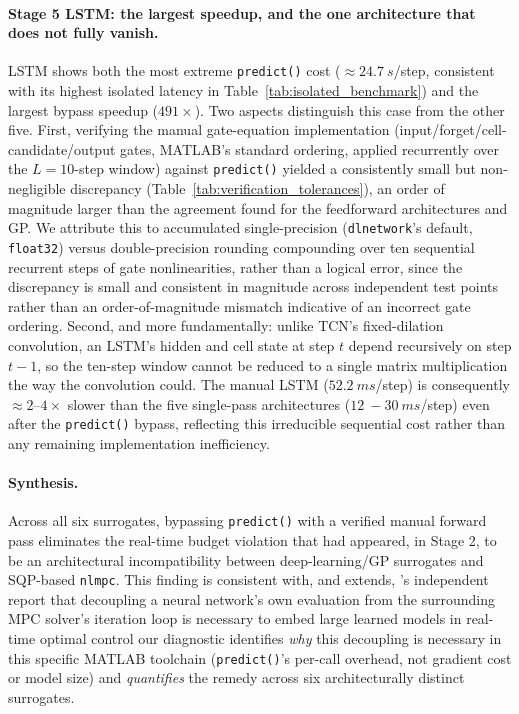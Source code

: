 \paragraph{Stage 5  LSTM: the largest speedup, and the one
architecture that does not fully vanish.} LSTM shows both the most
extreme \texttt{predict()} cost ($\approx\SI{24.7}{s}$/step, consistent
with its highest isolated latency in Table~\ref{tab:isolated_benchmark})
and the largest bypass speedup ($491\times$). Two aspects distinguish
this case from the other five. First, verifying the manual
gate-equation implementation (input/forget/cell-candidate/output gates,
MATLAB's standard ordering, applied recurrently over the
$L=10$-step window) against \texttt{predict()} yielded a consistently
small but non-negligible discrepancy (Table~\ref{tab:verification_tolerances}),
an order of magnitude larger than the agreement found for the feedforward architectures
and GP. We attribute this to accumulated single-precision
(\texttt{dlnetwork}'s default, \texttt{float32}) versus
double-precision rounding compounding over ten sequential recurrent
steps of gate nonlinearities, rather than a logical error, since the
discrepancy is small and consistent in magnitude across independent
test points rather than an order-of-magnitude mismatch indicative of an
incorrect gate ordering.
\label{subsec:lstm_precision_note}
Second, and more fundamentally: unlike TCN's fixed-dilation
convolution, an LSTM's hidden and cell state at step $t$ depend
recursively on step $t-1$, so the ten-step window cannot be reduced to
a single matrix multiplication the way the convolution could. The
manual LSTM ($\SI{52.2}{ms}$/step) is consequently $\approx 2$--$4\times$
slower than the five single-pass architectures ($\SI{12}{-}\SI{30}{ms}$/step)
even after the \texttt{predict()} bypass, reflecting this irreducible
sequential cost rather than any remaining implementation inefficiency.

\paragraph{Synthesis.} Across all six surrogates, bypassing
\texttt{predict()} with a verified manual forward pass eliminates the
real-time budget violation that had appeared, in Stage 2, to be an
architectural incompatibility between deep-learning/GP surrogates and
SQP-based \texttt{nlmpc}. This finding is consistent with, and extends,
\citet{salzmann_real-time_2022}'s independent report that decoupling a
neural network's own evaluation from the surrounding MPC solver's
iteration loop is necessary to embed large learned models in real-time
optimal control  our diagnostic identifies \emph{why} this
decoupling is necessary in this specific MATLAB toolchain
(\texttt{predict()}'s per-call overhead, not gradient cost or
model size) and \emph{quantifies} the remedy across six architecturally
distinct surrogates.

